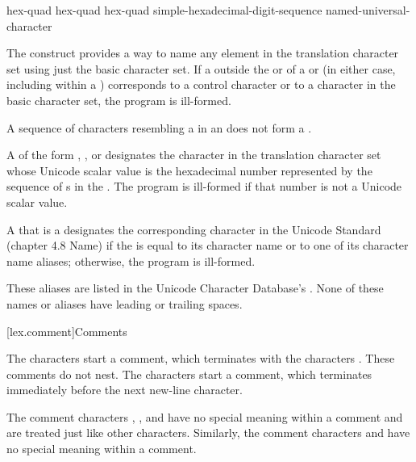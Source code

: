 \begin{bnf}
\br
     hex-quad\br
     hex-quad hex-quad\br
     simple-hexadecimal-digit-sequence \terminal{\}}\br
    named-universal-character
\end{bnf}

\pnum
The  construct provides a way to name any
element in the translation character set using just the basic character set.
If a  outside
the  or 
of a  or 
(in either case, including within a )
corresponds to a control character or to a character in the basic character set,
the program is ill-formed.
\begin{note}
A sequence of characters resembling a  in an
 does not form a
.
\end{note}

\pnum
A 
of the form  ,
  , or
designates the character in the translation character set
whose Unicode scalar value is the hexadecimal number represented by
the sequence of s
in the .
The program is ill-formed if that number is not a Unicode scalar value.

\pnum
A 
that is a 
designates the corresponding character
in the Unicode Standard (chapter 4.8 Name)
if the  is equal
to its character name or
to one of its character name aliases;
otherwise, the program is ill-formed.
\begin{note}
These aliases are listed in
the Unicode Character Database's .
None of these names or aliases have leading or trailing spaces.
\end{note}

[lex.comment]{Comments}

\pnum
{}%
%
%
The characters \tcode{/*} start a comment, which terminates with the
characters \tcode{*/}. These comments do not nest.
%
The characters \tcode{//} start a comment, which terminates immediately before the
next new-line character.
\begin{note}
The comment characters \tcode{//}, \tcode{/*},
and \tcode{*/} have no special meaning within a \tcode{//} comment and
are treated just like other characters. Similarly, the comment
characters \tcode{//} and \tcode{/*} have no special meaning within a
\tcode{/*} comment.
\end{note}

